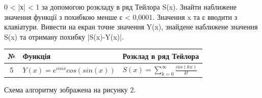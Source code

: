 \documentclass{article}
\begin{document}
{0 < |х| < 1 за допомогою розкладу в ряд Тейлора S(x). Знайти наближене
значення функції з похибкою менше ε < 0,0001. Значення x та ε вводити з
клавіатури. Вивести на екран точне значення Y(x), знайдене наближене значення S(x) та отриману похибку |S(x)-Y(x)|.

\vspace{.5cm}
\renewcommand{\arraystretch}{2}
\begin{tabular}{|c| l| l|}
	\hline
	№ & Функція & Розклад в ряд Тейлора\\
	\hline
	5 & $Y(x)=e^{cosx}cos(sin(x))$ & $S(x)=\displaystyle\sum_{k=0}^{\infty} \frac{cos(kx)}{k!}$ \\
	\hline
\end{tabular}

\bigskip

Схема алгоритму зображена на рисунку 2.


	\newpage

}
\end{document}
